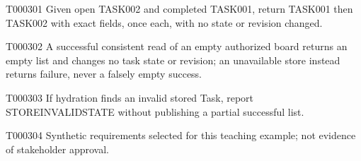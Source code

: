 \documentclass[11pt,a4paper]{article}
\begin{document}
\begin{atlasparagraph}{T000301}
Given open TASK002 and completed TASK001, return TASK001 then TASK002 with exact fields, once each, with no state or revision changed.
\end{atlasparagraph}
\begin{atlasparagraph}{T000302}
A successful consistent read of an empty authorized board returns an empty list and changes no task state or revision; an unavailable store instead returns failure, never a falsely empty success.
\end{atlasparagraph}
\begin{atlasparagraph}{T000303}
If hydration finds an invalid stored Task, report STORE\AtlasCharUnderscore{}INVALID\AtlasCharUnderscore{}STATE without publishing a partial successful list.
\end{atlasparagraph}
\begin{atlasparagraph}{T000304}
Synthetic requirements selected for this teaching example; not evidence of stakeholder approval.
\end{atlasparagraph}
\end{document}
